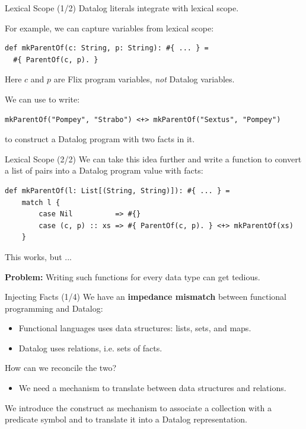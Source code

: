 \begin{frame}[fragile]{Lexical Scope (1/2)}
Datalog literals integrate with lexical scope.

For example, we can capture variables from lexical scope:

\begin{lstlisting}[language=flix, xleftmargin=0.8cm]
def mkParentOf(c: String, p: String): #{ ... } = 
  #{ ParentOf(c, p). }
\end{lstlisting}

Here $c$ and $p$ are Flix program variables, \emph{not} Datalog variables. 

We can use  to write:

\begin{lstlisting}[language=flix, xleftmargin=0.8cm]
mkParentOf("Pompey", "Strabo") <+> mkParentOf("Sextus", "Pompey")
\end{lstlisting}

to construct a Datalog program with two  facts in it.
\end{frame}

\begin{frame}[fragile]{Lexical Scope (2/2)}
We can take this idea further and write a function to convert a list of pairs
into a Datalog program value with  facts: 

\begin{lstlisting}[language=flix, xleftmargin=0.8cm]
def mkParentOf(l: List[(String, String)]): #{ ... } = 
    match l {
        case Nil          => #{}
        case (c, p) :: xs => #{ ParentOf(c, p). } <+> mkParentOf(xs)
    }
\end{lstlisting}

This works, but ...

\textbf{Problem:} Writing such functions for every data type can get tedious.
\end{frame}

\begin{frame}[fragile]{Injecting Facts (1/4)}
We have an \textbf{impedance mismatch} between functional programming and Datalog:

\begin{itemize}
    \item Functional languages uses data structures: lists, sets, and maps.
    \item Datalog uses relations, i.e. sets of facts.
\end{itemize}

How can we reconcile the two? 

\begin{itemize}
    \item We need a mechanism to translate between data structures and
    relations. 
\end{itemize}

We introduce the  construct as mechanism to associate a collection
with a predicate symbol and to translate it into a Datalog representation.
\end{frame}


